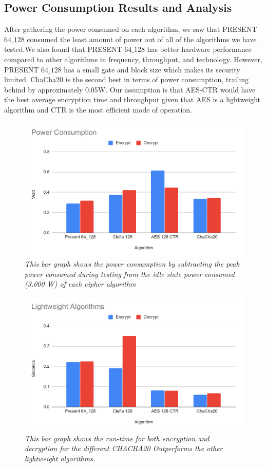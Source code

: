 \documentclass[conference]{IEEEtran}
\begin{document}
\subsection{Power Consumption Results and Analysis}
After gathering the power consumed on each algorithm, we saw that PRESENT $64\_128$ consumed the least amount of power out of all of the algorithms we have tested.We also found that PRESENT $64\_128$ has better hardware performance compared to other algorithms in frequency, throughput, and technology\cite{1}. However, PRESENT $64\_128$ has a small gate and block size which makes its security limited. ChaCha20 is the second best in terms of power consumption, trailing behind by approximately 0.05W. Our assumption is that AES-CTR would have the best average encryption time and throughput given that AES is a lightweight algorithm and CTR is the most efficient mode of operation. 

\FloatBarrier
\begin{figure}[htbp]
	\centerline{\includegraphics[scale=0.3]{fig3.png}}
	\caption{\textit{This bar graph shows the power consumption by subtracting the peak power consumed during testing from the idle state power consumed (3.000 W) of each cipher algorithm}}
	\label{fig3}
\end{figure}

\begin{figure}[htbp]
	\centerline{\includegraphics[scale=0.3]{fig4.png}}
	\caption{\textit{This bar graph shows the run-time for both encryption and decryption for the different CHACHA20 Outperforms the other lightweight algorithms.}}
	\label{fig4}
\end{figure}
\FloatBarrier
\end{document}
